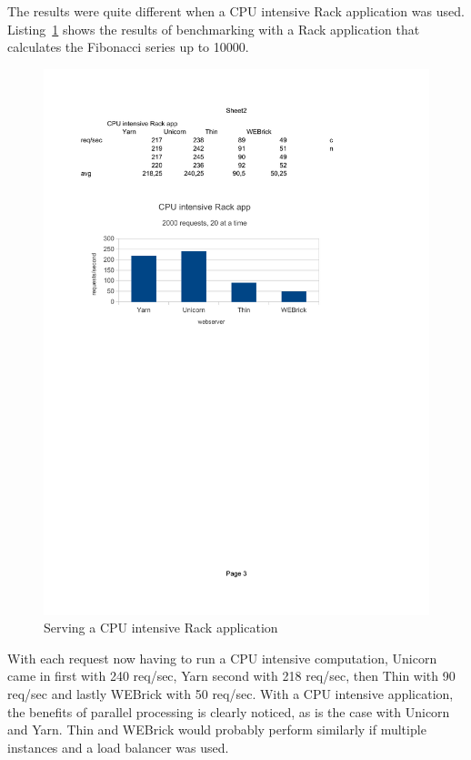 The results were quite different when a CPU intensive Rack application was
used. Listing~\ref{cpubench} shows the results of benchmarking with a Rack
application that calculates the Fibonacci series up to 10000.

\begin{figure}[htb]
  \centering
  \includegraphics[width=1.0\textwidth]{benchmark/cpu.pdf}
  \caption{Serving a CPU intensive Rack application}
  \label{cpubench}
\end{figure}

With each request now having to run a CPU intensive computation, Unicorn came in
first with 240 req/sec, Yarn second with 218 req/sec, then Thin with 90
req/sec and lastly WEBrick with 50 req/sec. With a CPU intensive application,
the benefits of parallel processing is clearly noticed, as is the case with
Unicorn and Yarn. Thin and WEBrick would probably perform similarly if
multiple instances and a load balancer was used.

